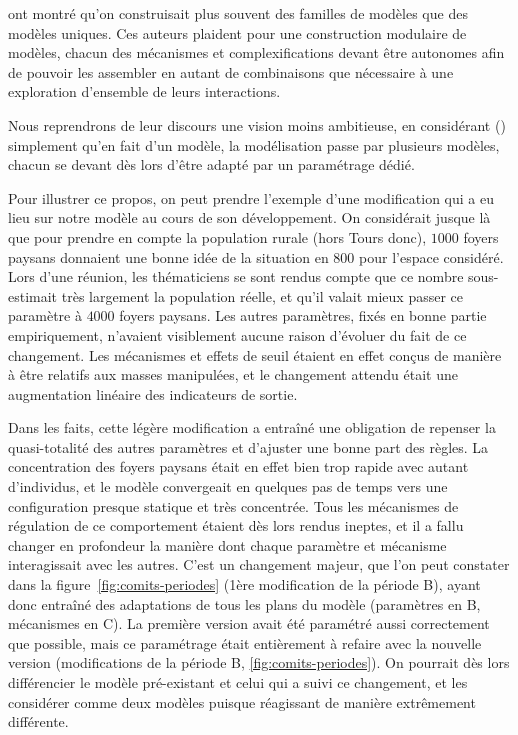 \documentclass[12pt, a4paper, oneside]{book}
\begin{document}
 ont montré qu'on construisait plus souvent des familles de modèles que des modèles uniques.
Ces auteurs plaident pour une construction modulaire de modèles, chacun des mécanismes et complexifications devant être autonomes afin de pouvoir les assembler en autant de combinaisons que nécessaire à une exploration d'ensemble de leurs interactions.

Nous reprendrons de leur discours une vision moins ambitieuse, en considérant () simplement qu'en fait d'un modèle, la modélisation passe par plusieurs modèles, chacun se devant dès lors d'être adapté par un paramétrage dédié.

Pour illustrer ce propos, on peut prendre l'exemple d'une modification qui a eu lieu sur notre modèle au cours de son développement. On considérait jusque là que pour prendre en compte la population rurale (hors Tours donc), $1000$ foyers paysans donnaient une bonne idée de la situation en 800 pour l'espace considéré.
Lors d'une réunion, les thématiciens se sont rendus compte que ce nombre sous-estimait très largement la population réelle, et qu'il valait mieux passer ce paramètre à $4000$ foyers paysans.
Les autres paramètres, fixés en bonne partie empiriquement, n'avaient visiblement aucune raison d'évoluer du fait de ce changement. Les mécanismes  et effets de seuil étaient en effet conçus de manière à être relatifs aux masses manipulées, et le changement attendu était une augmentation linéaire des indicateurs de sortie.

Dans les faits, cette légère modification a entraîné une obligation de repenser la quasi-totalité des autres paramètres et d'ajuster une bonne part des règles. 
La concentration des foyers paysans était en effet bien trop rapide avec autant d'individus, et le modèle convergeait en quelques pas de temps vers une configuration presque statique et très concentrée.
Tous les mécanismes de régulation de ce comportement étaient dès lors rendus ineptes, et il a fallu changer en profondeur la manière dont chaque paramètre et mécanisme interagissait avec les autres.
C'est un changement majeur, que l'on peut constater dans la figure~\ref{fig:comits-periodes} (1ère modification de la période B), ayant donc entraîné des adaptations de tous les plans du modèle (paramètres en B, mécanismes en C).
La première version avait été paramétré aussi correctement que possible, mais ce paramétrage était entièrement à refaire avec la nouvelle version (modifications de la période B, \cref{fig:comits-periodes}).
On pourrait dès lors différencier le modèle pré-existant et celui qui a suivi ce changement, et les considérer comme deux modèles puisque réagissant de manière extrêmement différente.
\end{document}
